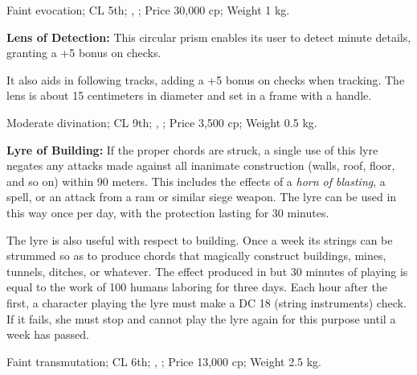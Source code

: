 Faint evocation; CL 5th; , ; Price 30,000 cp; Weight 1 kg.



\textbf{Lens of Detection:} This circular prism enables its user to detect minute details, granting a +5 bonus on  checks.

It also aids in following tracks, adding a +5 bonus on  checks when tracking. The lens is about 15 centimeters in diameter and set in a frame with a handle.

Moderate divination; CL 9th; , ; Price 3,500 cp; Weight 0.5 kg.



\textbf{Lyre of Building:} If the proper chords are struck, a single use of this lyre negates any attacks made against all inanimate construction (walls, roof, floor, and so on) within 90 meters. This includes the effects of a \emph{horn of blasting}, a  spell, or an attack from a ram or similar siege weapon. The lyre can be used in this way once per day, with the protection lasting for 30 minutes.

The lyre is also useful with respect to building. Once a week its strings can be strummed so as to produce chords that magically construct buildings, mines, tunnels, ditches, or whatever. The effect produced in but 30 minutes of playing is equal to the work of 100 humans laboring for three days. Each hour after the first, a character playing the lyre must make a DC 18  (string instruments) check. If it fails, she must stop and cannot play the lyre again for this purpose until a week has passed.

Faint transmutation; CL 6th; , ; Price 13,000 cp; Weight 2.5 kg.







